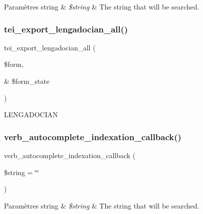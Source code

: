 \begin{DoxyParams}[1]{Paramètres}
string & {\em \$string} & The string that will be searched. \\
\hline
\end{DoxyParams}
\hypertarget{conjoc__lengadocian__webForm_8inc_a9c7725a828c1a44761bc51fe7a346215}{}\label{conjoc__lengadocian__webForm_8inc_a9c7725a828c1a44761bc51fe7a346215} 
\subsubsection{\texorpdfstring{tei\+\_\+export\+\_\+lengadocian\+\_\+all()}{tei\_export\_lengadocian\_all()}}
{\footnotesize\ttfamily tei\+\_\+export\+\_\+lengadocian\+\_\+all (\begin{DoxyParamCaption}\item[{}]{\$form,  }\item[{\&}]{\$form\+\_\+state }\end{DoxyParamCaption})}

L\+E\+N\+G\+A\+D\+O\+C\+I\+AN \hypertarget{conjoc__lengadocian__webForm_8inc_a378d4601a46c698692d26cb301470598}{}\label{conjoc__lengadocian__webForm_8inc_a378d4601a46c698692d26cb301470598} 
\subsubsection{\texorpdfstring{verb\+\_\+autocomplete\+\_\+indexation\+\_\+callback()}{verb\_autocomplete\_indexation\_callback()}}
{\footnotesize\ttfamily verb\+\_\+autocomplete\+\_\+indexation\+\_\+callback (\begin{DoxyParamCaption}\item[{}]{\$string = {\ttfamily \char`\"{}\char`\"{}} }\end{DoxyParamCaption})}


\begin{DoxyParams}[1]{Paramètres}
string & {\em \$string} & The string that will be searched. \\
\hline
\end{DoxyParams}
